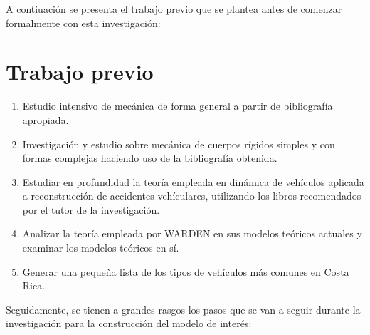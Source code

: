 \begin{singlespace}
\hspace{1 cm} A contiuación se presenta el trabajo previo que se plantea antes de comenzar formalmente con esta investigación:
\section{Trabajo previo}
\begin{enumerate}
\item Estudio intensivo de mecánica de forma general a partir de bibliografía apropiada.
\item Investigación y estudio sobre mecánica de cuerpos rígidos simples y con formas complejas haciendo uso de la bibliografía obtenida.
\item Estudiar en profundidad la teoría empleada en dinámica de vehículos aplicada a reconstrucción de accidentes vehículares, utilizando los libros recomendados por el tutor de la investigación.
\item Analizar la teoría empleada por WARDEN en sus modelos teóricos actuales y examinar los modelos teóricos en sí.
\item Generar una pequeña lista de los tipos de vehículos más comunes en Costa Rica.
\end{enumerate}

\hspace{1 cm} Seguidamente, se tienen a grandes rasgos los pasos que se van a seguir durante la investigación para la construcción del modelo de interés:


\end{singlespace}
